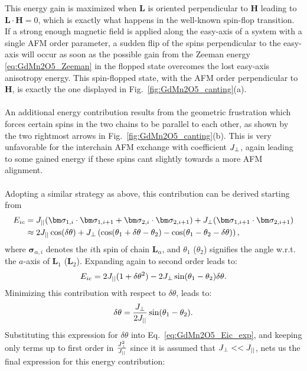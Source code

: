 This energy gain is maximized when $\bm{L}$ is oriented perpendicular to $\bm{H}$ leading to $\bm L \cdot \bm H = 0$, which is exactly what happens in the well-known spin-flop transition.
If a strong enough magnetic field is applied along the easy-axis of a system with a single AFM order parameter, a sudden flip of the spins perpendicular to the easy-axis will occur as soon as the possible gain from the Zeeman energy \eqref{eq:GdMn2O5_Zeeman} in the flopped state overcomes the lost easy-axis anisotropy energy. This spin-flopped state, with the AFM order perpendicular to $\bm{H}$, is exactly the one displayed in Fig.~\ref{fig:GdMn2O5_canting}(a).
\\\\
An additional energy contribution results from the geometric frustration which forces certain spins in the two chains to be parallel to each other, as shown by the two rightmost arrows in Fig.~\ref{fig:GdMn2O5_canting}(b).
This is very unfavorable for the interchain AFM exchange with coefficient $J_{\perp}$, again leading to some gained energy if these spins cant slightly towards a more AFM alignment.
\\\\
Adopting a similar strategy as above, this contribution can be derived starting from
\begin{align}
	E_{ic} &= \Jpar (\bm \sigma_{1, i} \cdot \bm \sigma_{1, i+1} + \bm \sigma_{2, i} \cdot \bm \sigma_{2, i+1}) + \Jperp(\bm \sigma_{1, i+1} \cdot \bm \sigma_{2,i+1}) \\
	 &\approx 2 \Jpar \cos(\delta \theta) + \Jperp \left(\cos(\theta_1 + \delta \theta - \theta_2) - \cos(\theta_1 - \theta_2 -\delta \theta)\right),
\end{align}
where $\bm \sigma_{\alpha, i}$ denotes the $i$th spin of chain $\bm L_\alpha$, and $\theta_1$ ($\theta_2$) signifies the angle w.r.t. the $a$-axis of $\bm{L}_1$ ($\bm{L}_2$).
Expanding again to second order leads to:
\begin{equation}
	E_{ic} = 2 J_{||} ( 1+ \delta \theta^2) - 2 J_{\perp} \sin(\theta_1 - \theta_2)\delta \theta. \label{eq:GdMn2O5_Eic_exp}
\end{equation}
Minimizing this contribution with respect to $\delta \theta$, leads to:
\begin{equation}
	\delta \theta = \frac{J_{\perp}}{2 J_{||}} \sin(\theta_1 - \theta_2).
\end{equation}
Substituting this expression for $\delta \theta$ into Eq.~\eqref{eq:GdMn2O5_Eic_exp}, and keeping only terms up to first order in $\frac{J_{\perp}^2}{J_{||}}$ since it is assumed that $J_{\perp} << J_{||}$, nets us the final expression for this energy contribution:
